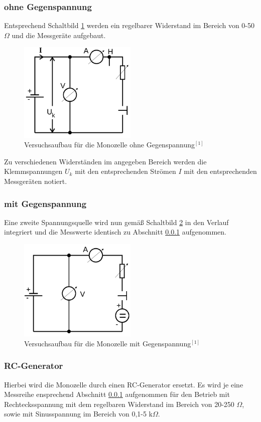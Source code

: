 \subsubsection{ohne Gegenspannung}
\label{sec_ogegen}
Entsprechend Schaltbild \ref{pic_ogegenspannung} werden ein regelbarer Widerstand im Bereich von 0-50 $\Omega$ und die Messgeräte aufgebaut.
\begin{figure}[H]
 \includegraphics[width=0.5\textwidth]{pics/ohne.png}
 \caption{Versuchsaufbau für die Monozelle ohne Gegenspannung$^{[1]}$}
 \label{pic_ogegenspannung}
\end{figure}
Zu verschiedenen Widerständen im angegeben Bereich werden die Klemmspannungen $U_k$ mit den entsprechenden Strömen $I$ mit den entsprechenden
Messgeräten notiert.
\subsubsection{mit Gegenspannung}
Eine zweite Spannungsquelle wird nun gemäß Schaltbild \ref{pic_mgegenspannung} in den Verlauf integriert und die Messwerte identisch zu Abschnitt
\ref{sec_ogegen} aufgenommen.
\begin{figure}[H]
 \includegraphics[width=0.5\textwidth]{pics/mit.png}
 \caption{Versuchsaufbau für die Monozelle mit Gegenspannung$^{[1]}$}
 \label{pic_mgegenspannung}
\end{figure}
\subsubsection{RC-Generator}
Hierbei wird die Monozelle durch einen RC-Generator ersetzt. Es wird je eine Messreihe ensprechend Abschnitt \ref{sec_ogegen} aufgenommen
für den Betrieb mit Rechtecksspannung mit dem regelbaren Widerstand im Bereich von 20-250 $\Omega$, sowie mit Sinusspannung im Bereich von
0,1-5 k$\Omega$.
